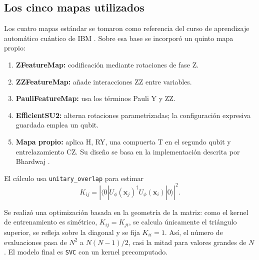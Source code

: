 \documentclass[9pt,a4paper]{extarticle}
\begin{document}
\subsection{Los cinco mapas utilizados}
Los cuatro mapas estándar se tomaron como referencia del curso de aprendizaje automático cuántico de IBM \cite{ibm}. Sobre esa base se incorporó un quinto mapa propio:
\begin{enumerate}
  \item \textbf{ZFeatureMap:} codificación mediante rotaciones de fase Z.
  \item \textbf{ZZFeatureMap:} añade interacciones ZZ entre variables.
  \item \textbf{PauliFeatureMap:} usa los términos Pauli Y y ZZ.
  \item \textbf{EfficientSU2:} alterna rotaciones parametrizadas; la configuración expresiva guardada emplea un qubit.
  \item \textbf{Mapa propio:} aplica H, RY, una compuerta T en el segundo qubit y entrelazamiento CZ. Su diseño se basa en la implementación descrita por Bhardwaj \cite{custom_fm}.
\end{enumerate}

\par\smallskip\noindent El cálculo usa \texttt{unitary\_overlap} para estimar
\begin{equation}
K_{ij}=\left|\langle 0|U_{\phi}(\mathbf{x}_j)^{\dagger}
U_{\phi}(\mathbf{x}_i)|0\rangle\right|^2.
\end{equation}
\par\smallskip\noindent Se realizó una optimización basada en la geometría de la matriz: como el kernel de entrenamiento es simétrico, $K_{ij}=K_{ji}$, se calcula únicamente el triángulo superior, se refleja sobre la diagonal y se fija $K_{ii}=1$. Así, el número de evaluaciones pasa de $N^2$ a $N(N-1)/2$, casi la mitad para valores grandes de $N$. El modelo final es \texttt{SVC} con un kernel precomputado.
\end{document}
